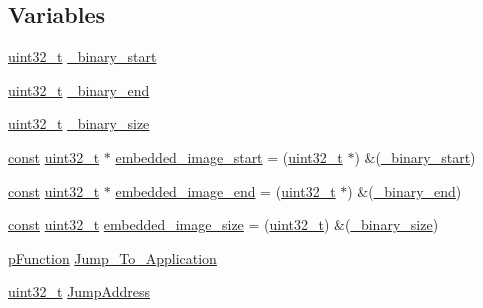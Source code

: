 \subsection*{Variables}
\begin{DoxyCompactItemize}
\item 
\hyperlink{stdint_8h_a435d1572bf3f880d55459d9805097f62}{uint32\-\_\-t} \hyperlink{group___open_pilot_b_l_ga18e22c4c1de6a3912b0e36471b4c97af}{\-\_\-binary\-\_\-start}
\item 
\hyperlink{stdint_8h_a435d1572bf3f880d55459d9805097f62}{uint32\-\_\-t} \hyperlink{group___open_pilot_b_l_gaa9ad8016b46b914281992b372d57a1fd}{\-\_\-binary\-\_\-end}
\item 
\hyperlink{stdint_8h_a435d1572bf3f880d55459d9805097f62}{uint32\-\_\-t} \hyperlink{group___open_pilot_b_l_ga65b6d3b8a474ae5ea96d13fd17ec8e2f}{\-\_\-binary\-\_\-size}
\item 
\hyperlink{group___n_a_m_e_ga7ae6d0e43244213b34de2c2b9aa30da6}{const} \hyperlink{stdint_8h_a435d1572bf3f880d55459d9805097f62}{uint32\-\_\-t} $\ast$ \hyperlink{group___open_pilot_b_l_ga3afaa362525714c794fa80cf079ff93f}{embedded\-\_\-image\-\_\-start} = (\hyperlink{stdint_8h_a435d1572bf3f880d55459d9805097f62}{uint32\-\_\-t} $\ast$) \&(\hyperlink{group___open_pilot_b_l_ga18e22c4c1de6a3912b0e36471b4c97af}{\-\_\-binary\-\_\-start})
\item 
\hyperlink{group___n_a_m_e_ga7ae6d0e43244213b34de2c2b9aa30da6}{const} \hyperlink{stdint_8h_a435d1572bf3f880d55459d9805097f62}{uint32\-\_\-t} $\ast$ \hyperlink{group___open_pilot_b_l_ga8b1e4a9a16473320612d8461c4d887b9}{embedded\-\_\-image\-\_\-end} = (\hyperlink{stdint_8h_a435d1572bf3f880d55459d9805097f62}{uint32\-\_\-t} $\ast$) \&(\hyperlink{group___open_pilot_b_l_gaa9ad8016b46b914281992b372d57a1fd}{\-\_\-binary\-\_\-end})
\item 
\hyperlink{group___n_a_m_e_ga7ae6d0e43244213b34de2c2b9aa30da6}{const} \hyperlink{stdint_8h_a435d1572bf3f880d55459d9805097f62}{uint32\-\_\-t} \hyperlink{group___open_pilot_b_l_ga9735096d394222154ea06b9b81667254}{embedded\-\_\-image\-\_\-size} = (\hyperlink{stdint_8h_a435d1572bf3f880d55459d9805097f62}{uint32\-\_\-t}) \&(\hyperlink{group___open_pilot_b_l_ga65b6d3b8a474ae5ea96d13fd17ec8e2f}{\-\_\-binary\-\_\-size})
\item 
\hyperlink{group___revolution_b_l_ga9227bf1f1a9c633a0cc9ca50cc761c1a}{p\-Function} \hyperlink{group___open_pilot_b_l_gafe6990204003a7b416139a4723064b14}{Jump\-\_\-\-To\-\_\-\-Application}
\item 
\hyperlink{stdint_8h_a435d1572bf3f880d55459d9805097f62}{uint32\-\_\-t} \hyperlink{group___open_pilot_b_l_ga77170d6dd28c130d54753378bdfa035e}{Jump\-Address}

\end{DoxyCompactItemize}
